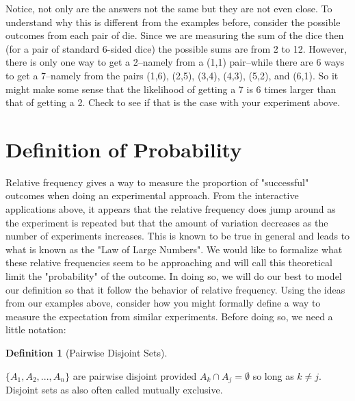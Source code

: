 \documentclass[10pt,]{book}
\theoremstyle{plain}
\theoremstyle{definition}
\newtheorem{definition}[theorem]{Definition}
\theoremstyle{definition}
\theoremstyle{definition}
\numberwithin{equation}{section}
\begin{document}
\par
Notice, not only are the answers not the same but they are not even close. To understand why this 
	is different from the examples before, consider the possible outcomes from each pair of die. Since we
	are measuring the sum of the dice then (for a pair of standard 6-sided dice) the possible sums are from 
	2 to 12. However, there is only one way to get a 2--namely from a (1,1) pair--while there are 6 ways to get
	a 7--namely from the pairs (1,6), (2,5), (3,4), (4,3), (5,2), and (6,1). So it might make some sense
	that the likelihood of getting a 7 is 6 times larger than that of getting a 2. Check to see if that
	is the case with your experiment above.%
\typeout{************************************************}
\typeout{************************************************}
\section[{Definition of Probability}]{Definition of Probability}\label{section-19}
\typeout{************************************************}
\typeout{************************************************}

		Relative frequency gives a way to measure the proportion of "successful" outcomes when doing an experimental approach. From the interactive applications above, it appears that the relative frequency does jump around as the experiment is repeated but that the amount of variation decreases as the number of experiments increases. This is known to be true in general and leads to what is known as the "Law of Large Numbers". We would like to formalize what these relative frequencies seem to be approaching and will call this theoretical limit the "probability" of the outcome. In doing so, we will do our best to model our definition so that it follow the behavior of relative frequency.
Using the ideas from our examples above, consider how you might formally define a way
	to measure the expectation from similar experiments.  Before doing so, we need a little notation:%
\begin{definition}[{Pairwise Disjoint Sets}]\label{definition-17}

	\( \{ A_1, A_2, ... , A_n \}\) are pairwise disjoint provided \(A_k \cap A_j = \emptyset\) so long as \(k \ne j\).
	Disjoint sets as also often called mutually exclusive.
\end{definition}
\par
\end{document}
